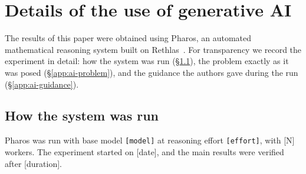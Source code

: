 \documentclass[11pt]{article}
\numberwithin{equation}{section}
\theoremstyle{plain}
\theoremstyle{definition}
\theoremstyle{remark}
\begin{document}
\appendix
\section{Details of the use of generative AI}\label{app:ai}

The results of this paper were obtained using Pharos, an
automated mathematical reasoning system built on Rethlas~\cite{Ju+26}. For
transparency we record the experiment in detail: how the system was run
(\S\ref{app:ai-run}), the problem exactly as it was posed
(\S\ref{app:ai-problem}), and the guidance the authors gave during the run
(\S\ref{app:ai-guidance}).

\subsection{How the system was run}\label{app:ai-run}
Pharos was run with base model \texttt{[model]} at reasoning effort
\texttt{[effort]}, with [N] workers. The experiment started on [date], and
the main results were verified after [duration].
\end{document}
